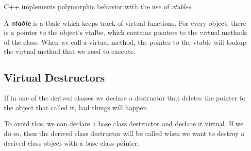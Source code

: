 \documentclass{article}
\begin{document}
C++ implements polymorphic behavior with the use of \textit{vtables}.

A \textbf{\textit{vtable}} is a tbale which keeps track of virtual functions. For every object, there is a pointer
to  the object's vtalbe, which contains pointers to the virtual methods of the class. When we call a virtual 
method, the pointer to the vtable will lookup the virtual method that we need to execute. 
\subsection{Virtual Destructors}
If in one of the derived classes we declare a destructor that deletes the pointer to the object that called
it, bad things will happen.

To avoid this, we can declare a base class destructor and declare it virtual. If we do so, then the derived
class destructor will be called when we want to destroy a derived class object with a base class pointer.
\end{document}
